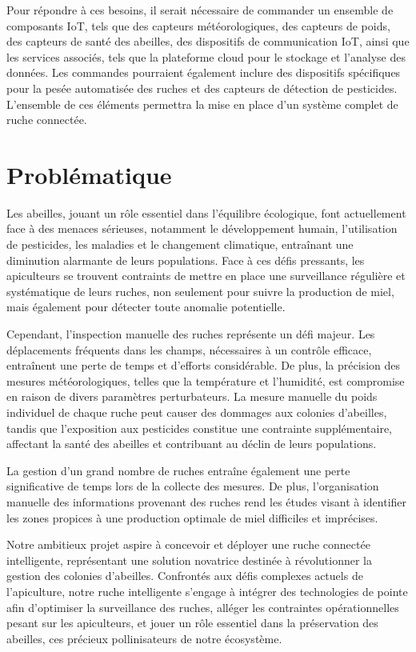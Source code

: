 \documentclass[a4paper,12pt]{report}
\begin{document}
	Pour répondre à ces besoins, il serait nécessaire de commander un ensemble de composants IoT, tels que des capteurs météorologiques, des capteurs de poids, des capteurs de santé des abeilles, des dispositifs de communication IoT, ainsi que les services associés, tels que la plateforme cloud pour le stockage et l'analyse des données. Les commandes pourraient également inclure des dispositifs spécifiques pour la pesée automatisée des ruches et des capteurs de détection de pesticides. L'ensemble de ces éléments permettra la mise en place d'un système complet de ruche connectée.
	\section*{Problématique}
	Les abeilles, jouant un rôle essentiel dans l'équilibre écologique, font actuellement face à des menaces sérieuses, notamment le développement humain, l'utilisation de pesticides, les maladies et le changement climatique, entraînant une diminution alarmante de leurs populations. Face à ces défis pressants, les apiculteurs se trouvent contraints de mettre en place une surveillance régulière et systématique de leurs ruches, non seulement pour suivre la production de miel, mais également pour détecter toute anomalie potentielle.
	
	Cependant, l'inspection manuelle des ruches représente un défi majeur. Les déplacements fréquents dans les champs, nécessaires à un contrôle efficace, entraînent une perte de temps et d'efforts considérable. De plus, la précision des mesures météorologiques, telles que la température et l'humidité, est compromise en raison de divers paramètres perturbateurs. La mesure manuelle du poids individuel de chaque ruche peut causer des dommages aux colonies d'abeilles, tandis que l'exposition aux pesticides constitue une contrainte supplémentaire, affectant la santé des abeilles et contribuant au déclin de leurs populations.
	
	La gestion d'un grand nombre de ruches entraîne également une perte significative de temps lors de la collecte des mesures. De plus, l'organisation manuelle des informations provenant des ruches rend les études visant à identifier les zones propices à une production optimale de miel difficiles et imprécises.
	
	Notre ambitieux projet aspire à concevoir et déployer une ruche connectée intelligente, représentant une solution novatrice destinée à révolutionner la gestion des colonies d'abeilles. Confrontés aux défis complexes actuels de l'apiculture, notre ruche intelligente s'engage à intégrer des technologies de pointe afin d'optimiser la surveillance des ruches, alléger les contraintes opérationnelles pesant sur les apiculteurs, et jouer un rôle essentiel dans la préservation des abeilles, ces précieux pollinisateurs de notre écosystème.
	
\end{document}
